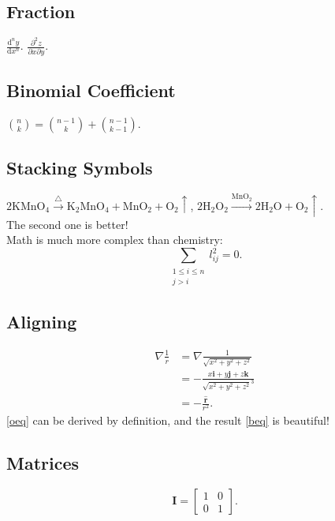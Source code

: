 \documentclass[a4paper,10pt]{article}
\begin{document}
    \subsection{Fraction}
    $\frac{\mathrm{d}^{n}y}{\mathrm{d}x^{n}}$.
    $\frac{\partial^{2}z}{\partial{x}\partial{y}}$.
    \subsection{Binomial Coefficient}
    $ \binom{n}{k} = \binom{n-1}{k} + \binom{n-1}{k-1}$.
    \subsection{Stacking Symbols}
    $ 2\text{K}\text{Mn}\text{O}_4 \stackrel{\triangle}{\longrightarrow}
      \text{K}_2\text{Mn}\text{O}_4+\text{Mn}\text{O}_2+\text{O}_2\uparrow $,
    $ 2\text{H}_2\text{O}_2 \xrightarrow[]{\text{Mn}\text{O}_2}
    2\text{H}_2\text{O}+\text{O}_2\uparrow $.\\
    The second one is better!\\
    Math is much more complex than chemistry:
    \begin{equation*}
        \sum_{\substack{1\le{i}\le{n}\\j>i}} l_{ij}^2 = 0.
    \end{equation*}
    \subsection{Aligning}
    \begin{align}
        \nabla\frac{1}{r} & = \nabla\frac{1}{\sqrt{x^2+y^2+z^2}} \label{oeq}\\
            & = -\frac{x\boldsymbol{i}+y\boldsymbol{j}+z\boldsymbol{k}}
                      {\sqrt{x^2+y^2+z^2}^3} \nonumber \\
            & = -\frac{\hat{\boldsymbol{r}}}{r^2}. \tag{$\star$} \label{beq}
    \end{align}
    \eqref{oeq} can be derived by definition,
    and the result \eqref{beq} is beautiful!
    \subsection{Matrices}
    \begin{equation*}
        \boldsymbol{I} =
        \begin{bmatrix}
            1 & 0 \\
            0 & 1
        \end{bmatrix}.
    \end{equation*}
\end{document}
